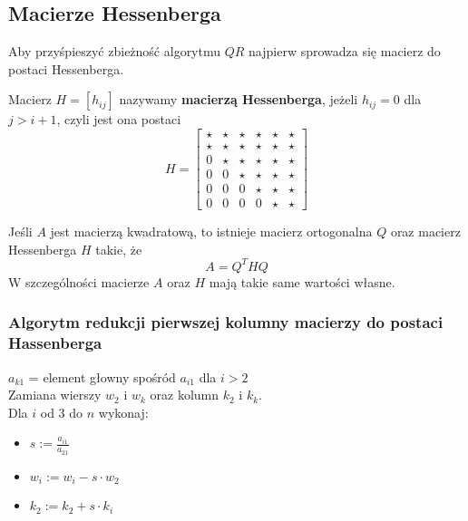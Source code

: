 \documentclass[../mn-notatki.tex]{subfiles}
\begin{document}
\subsection{Macierze Hessenberga}

Aby przyśpieszyć zbieżność algorytmu $QR$ najpierw sprowadza się macierz
do postaci Hessenberga.

\begin{tcolorbox}
Macierz $H = [h_{ij}]$ nazywamy \textbf{macierzą Hessenberga}, jeżeli
$h_{ij} = 0$ dla $j > i + 1$, czyli jest ona postaci
\[
    H = \left[ \begin{smallmatrix}
    \star & \star & \star & \star & \star & \star\\
    \star & \star & \star & \star & \star & \star\\
    0 & \star & \star & \star & \star & \star\\
    0 & 0 & \star & \star & \star & \star\\
    0 & 0 & 0 & \star & \star & \star\\
    0 & 0 & 0 & 0 & \star & \star
    \end{smallmatrix} \right]
\]
\end{tcolorbox}

\begin{tcolorbox}
Jeśli $A$ jest macierzą kwadratową, to istnieje macierz ortogonalna $Q$ oraz
macierz Hessenberga $H$ takie, że
\[
A = Q^T H Q
\]
W szczególności macierze $A$ oraz $H$ mają takie same wartości własne.
\end{tcolorbox}

\subsubsection{Algorytm redukcji pierwszej kolumny macierzy do postaci
Hassenberga}

\begin{tcolorbox}
$a_{k1}$ = element głowny spośród $a_{i1}$ dla $i > 2$\\
Zamiana wierszy $w_2$ i $w_k$ oraz kolumn $k_2$ i $k_k$.\\
Dla $i$ od $3$ do $n$ wykonaj:
\begin{itemize}
    \item $s := \frac{a_{i1}}{a_{21}} $
    \item $w_i := w_i - s \cdot w_2$
    \item $k_2 := k_2 + s\cdot k_i$
\end{itemize}
\end{tcolorbox}
\end{document}
